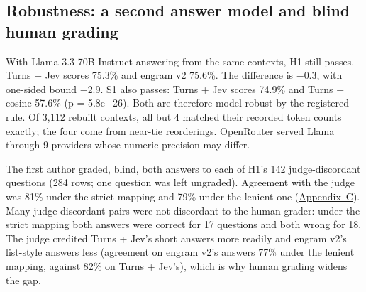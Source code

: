 \documentclass[11pt]{article}
\newcommand{\src}[1]{}
\begin{document}
\subsection{Robustness: a second answer model and blind human grading}\label{sec:5.4}
With Llama 3.3 70B Instruct answering from the same contexts, H1 still passes. Turns + Jev scores 75.3\%\src{bench/results/v3/second\_model\_report.json\#H1/llama-3.3-70b/acc\_a} and engram v2 75.6\%\src{bench/results/v3/second\_model\_report.json\#H1/llama-3.3-70b/acc\_b}. The difference is $-$0.3\src{bench/results/v3/second\_model\_report.json\#H1/llama-3.3-70b/d\_bar}, with one-sided bound $-$2.9\src{bench/results/v3/second\_model\_report.json\#H1/llama-3.3-70b/lower\_bound\_95\_one\_sided}. S1 also passes: Turns + Jev scores 74.9\%\src{bench/results/v3/second\_model\_report.json\#S1/llama-3.3-70b/acc\_a} and Turns + cosine 57.6\%\src{bench/results/v3/second\_model\_report.json\#S1/llama-3.3-70b/acc\_b} (p = 5.8e$-$26\src{bench/results/v3/second\_model\_report.json\#S1/llama-3.3-70b/p\_two\_sided}). Both are therefore model-robust by the registered rule. Of 3,112\src{bench/results/v3/second\_model\_report.json (four arms x 778 questions)} rebuilt contexts, all but 4\src{bench/results/v3/second\_model\_report.json\#context\_mismatches} matched their recorded token counts exactly; the four come from near-tie reorderings. OpenRouter served Llama through 9\src{bench/results/v3/second\_model\_report.json\#providers (count)} providers whose numeric precision may differ.

The first author graded, blind, both answers to each of H1's 142\src{bench/results/v3/batch\_b\_report.json\#H1 (only\_a + only\_b)} judge-discordant questions (284\src{bench/results/v3/human\_audit/audit\_report.json\#rows} rows; one question was left ungraded). Agreement with the judge was 81\%\src{bench/results/v3/human\_audit/audit\_report.json\#strict/agreement\_with\_judge} under the strict mapping and 79\%\src{bench/results/v3/human\_audit/audit\_report.json\#lenient/agreement\_with\_judge} under the lenient one (\hyperref[app:C]{Appendix~C}). Many judge-discordant pairs were not discordant to the human grader: under the strict mapping both answers were correct for 17\src{bench/results/v3/human\_audit/audit\_report.json\#strict/human\_both\_correct} questions and both wrong for 18\src{bench/results/v3/human\_audit/audit\_report.json\#strict/human\_both\_wrong}. The judge credited Turns + Jev's short answers more readily and engram v2's list-style answers less (agreement on engram v2's answers 77\%\src{bench/results/v3/human\_audit/audit\_report.json\#lenient/agreement\_with\_judge\_by\_system/engram} under the lenient mapping, against 82\%\src{bench/results/v3/human\_audit/audit\_report.json\#lenient/agreement\_with\_judge\_by\_system/T0R} on Turns + Jev's), which is why human grading widens the gap.
\end{document}

